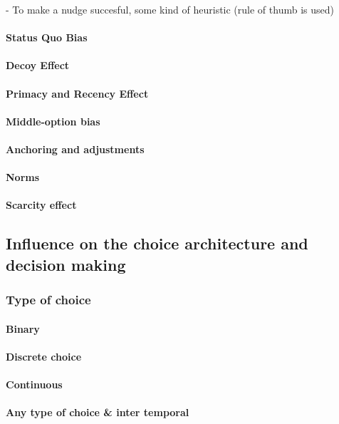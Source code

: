 - To make a nudge succesful, some kind of heuristic (rule of thumb is used) \cite{thaler_nudge:_2009}

\paragraph{Status Quo Bias}
\paragraph{Decoy Effect}
\paragraph{Primacy and Recency Effect}
\paragraph{Middle-option bias}
\paragraph{Anchoring and adjustments}
\paragraph{Norms}
\paragraph{Scarcity effect}


\subsection{Influence on the choice architecture and decision making}

\subsubsection{Type of choice}
\paragraph{Binary}
\paragraph{Discrete choice}
\paragraph{Continuous}
\paragraph{Any type of choice \& inter temporal}

